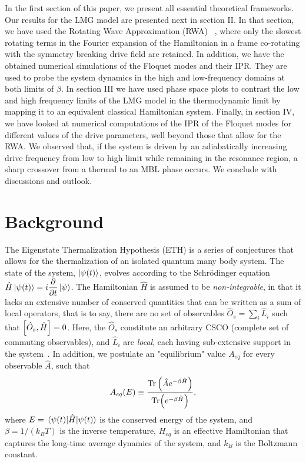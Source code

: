 \documentclass[%
reprint,
superscriptaddress,
linenumbers,
amsmath,amssymb,
aps,
prb,
showkeys,
]{revtex4-2}
\begin{document}
	In the first section of this paper, we present all essential theoretical frameworks. Our results for the LMG model are presented next in section II. In that section, we have used the Rotating Wave Approximation (RWA) ~\cite{fujii_introduction_2017}, where only the slowest rotating terms in the Fourier expansion of the Hamiltonian in a frame co-rotating with the symmetry breaking drive field are retained. In addition, we have the obtained {numerical simulations of} the Floquet modes and their IPR. They are used to probe the system dynamics in the high and low-frequency domains at both limits of $\beta$. In section III we have used phase space plots to contrast the low and high frequency limits of the LMG model in the thermodynamic limit by mapping it to an equivalent classical Hamiltonian system. Finally, in section IV, we have looked at numerical computations of the IPR of the Floquet modes for different values of the drive parameters, well beyond those that allow for the RWA. We observed that, if the system is driven by an adiabatically increasing drive frequency from low to high limit while remaining in the resonance region, a sharp crossover from a thermal to an MBL phase occurs. We conclude with discussions and outlook.
	
\section{\label{sec:background} Background}
	
The Eigenstate Thermalization Hypothesis (ETH) is a series of conjectures that allows for the thermalization of an isolated quantum many body system. The state of the system, $\ket{\psi(t)}$, evolves according to the Schr\"odinger equation $\hat{H}\ket{\psi(t)} = i\displaystyle\frac{\partial}{\partial t}\ket{\psi}$. The Hamiltonian $\hat{H}$ is assumed to be \textit{non-integrable}, in that  {it lacks an extensive number of conserved quantities that can be written as a sum of local operators, that is to say, there are no set of observables   $\hat{O}_s = \sum_i \hat{L}_i$ such that $\comm{\hat{O}_s}{\hat{H}}=0$. Here, the $\hat{O}_s$ constitute an arbitrary CSCO (complete set of commuting observables), and $\hat{L}_i$ are \textit{local}, each having sub-extensive support in the system}~\cite{Sutherland2004}. In addition, we postulate an "equilibrium" value $A_{eq}$ for every observable $\hat{A}$, such that
\begin{equation}
	\label{eq:aeq}
 A_{eq}(E)\equiv \frac{\Tr \left(\hat{A}e^{-\beta \hat{H}}\right)}{\Tr(e^{-\beta \hat{H}})},
\end{equation}
where $E=\expval{\hat{H}}{\psi(t)}$ is the conserved energy of the system, and $\beta = 1/(k_B T)$ is the inverse temperature, $H_{eq}$ is an effective Hamiltonian that captures the long-time average dynamics of the system, and $k_B$ is the Boltzmann constant.
\end{document}
